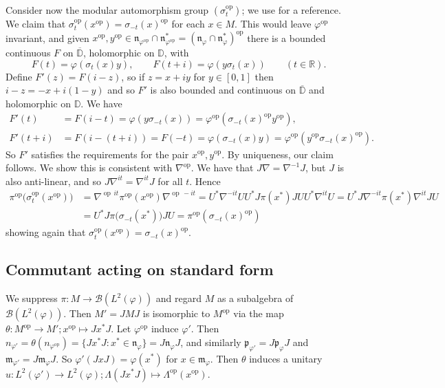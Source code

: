 \documentclass[a4paper,11pt]{article}
\theoremstyle{plain}
\theoremstyle{remark}
\newcommand{\mc}[1]{\mathcal{#1}}
\newcommand{\mf}[1]{\mathfrak{#1}}
\newcommand{\op}{{\operatorname{op}}}
\begin{document}
Consider now the modular automorphism group $(\sigma_t^\op)$; we use \cite[Section~VIII.1]{TakesakiII} for a reference.  We claim that $\sigma_t^\op(x^\op) = \sigma_{-t}(x)^\op$ for each $x\in M$.    This would leave $\varphi^\op$ invariant, and given $x^\op,y^\op\in\mf n_{\varphi^\op} \cap \mf n_{\varphi^\op}^* = (\mf n_\varphi \cap \mf n_\varphi^*)^\op$ there is a bounded continuous $F$ on $\overline{\mathbb D}$, holomorphic on $\mathbb D$, with
\[ F(t) = \varphi(\sigma_t(x)y), \qquad F(t+i) = \varphi(y\sigma_t(x)) \qquad (t\in\mathbb R). \]
Define $F'(z) = F(i-z)$, so if $z = x+iy$ for $y\in [0,1]$ then $i-z = -x + i(1-y)$ and so $F'$ is also bounded and continuous on $\overline{\mathbb D}$ and holomorphic on $\mathbb D$.  We have
\begin{align*}
F'(t) &= F(i-t) = \varphi(y\sigma_{-t}(x)) = \varphi^\op(\sigma_{-t}(x)^\op y^\op),  \\
F'(t+i) &= F(i-(t+i)) = F(-t) = \varphi(\sigma_{-t}(x) y) = \varphi^\op(y^\op \sigma_{-t}(x)^\op).
\end{align*}
So $F'$ satisfies the requirements for the pair $x^\op, y^\op$.  By uniqueness, our claim follows.  We show this is consistent with $\nabla^\op$.  We have that $J\nabla = \nabla^{-1}J$, but $J$ is also anti-linear, and so $J\nabla^{it} = \nabla^{it}J$ for all $t$.  Hence
\begin{align*}
\pi^\op\big( \sigma^\op_t(x^\op) \big)
&= \nabla^{\op\, it} \pi^\op(x^\op) \nabla^{\op\, -it}
= U^* \nabla^{-it} U U^* J\pi(x^*)J U U^* \nabla^{it} U
= U^* J \nabla^{-it} \pi(x^*) \nabla^{it} J U \\
&= U^* J \pi\big(\sigma_{-t}(x^*)\big) J U
= \pi^\op(\sigma_{-t}(x)^\op)
\end{align*}
showing again that $\sigma_t^\op(x^\op) = \sigma_{-t}(x)^\op$.



\subsection{Commutant acting on standard form}

We suppress $\pi\colon M \to\mc B(L^2(\varphi))$ and regard $M$ as a subalgebra of $\mc B(L^2(\varphi))$.  Then $M' = JMJ$ is isomorphic to $M^\op$ via the map $\theta \colon M^\op \to M'; x^\op \mapsto Jx^*J$.  Let $\varphi^\op$ induce $\varphi'$.  Then $n_{\varphi'} = \theta(n_{\varphi^\op}) = \{ Jx^*J : x^*\in\mf n_\varphi\} = J\mf n_\varphi J$, and similarly $\mf p_{\varphi'} = J\mf p_\varphi J$ and $\mf m_{\varphi'} = J\mf m_\varphi J$.  So $\varphi'(JxJ) = \varphi(x^*)$ for $x\in\mf m_\varphi$.  Then $\theta$ induces a unitary $u \colon L^2(\varphi') \to L^2(\varphi); \Lambda(Jx^*J) \mapsto \Lambda^\op(x^\op)$.
\end{document}
